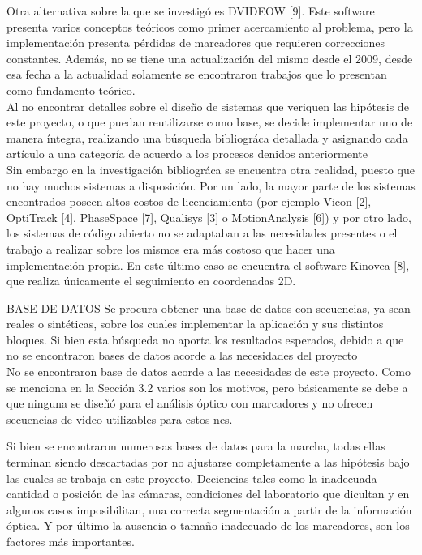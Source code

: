 Otra alternativa sobre la que se investigó es DVIDEOW [9]. Este software presenta
varios conceptos teóricos como primer acercamiento al problema, pero la
implementación presenta pérdidas de marcadores que requieren correcciones constantes.
Además, no se tiene una actualización del mismo desde el 2009, desde esa
fecha a la actualidad solamente se encontraron trabajos que lo presentan como
fundamento teórico.\\

Al no encontrar detalles sobre el diseño de sistemas que veriquen las hipótesis
de este proyecto, o que puedan reutilizarse como base, se decide implementar uno
de manera íntegra, realizando una búsqueda bibliográca detallada y asignando cada
artículo a una categoría de acuerdo a los procesos denidos anteriormente\\

Sin embargo en la investigación bibliográca se encuentra otra realidad, puesto
que no hay muchos sistemas a disposición. Por un lado, la mayor parte de los
sistemas encontrados poseen altos costos de licenciamiento (por ejemplo Vicon [2],
OptiTrack [4], PhaseSpace [7], Qualisys [3] o MotionAnalysis [6]) y por otro lado, los
sistemas de código abierto no se adaptaban a las necesidades presentes o el trabajo
a realizar sobre los mismos era más costoso que hacer una implementación propia.
En este último caso se encuentra el software Kinovea [8], que realiza únicamente el
seguimiento en coordenadas 2D.




BASE DE DATOS
Se procura obtener una base de datos con secuencias, ya sean reales o sintéticas, sobre los cuales implementar la aplicación y sus distintos bloques. Si bien esta búsqueda no aporta los resultados esperados,
 debido a que no se encontraron bases de datos acorde a las necesidades del proyecto\\

No se encontraron base de datos acorde a las necesidades de este proyecto.
Como se menciona en la Sección 3.2 varios son los motivos, pero básicamente se
debe a que ninguna se diseñó para el análisis óptico con marcadores y no ofrecen
secuencias de video utilizables para estos nes.

Si bien se encontraron numerosas bases de datos para la marcha, todas ellas
terminan siendo descartadas por no ajustarse completamente a las hipótesis bajo las
cuales se trabaja en este proyecto. Deciencias tales como la inadecuada cantidad
o posición de las cámaras, condiciones del laboratorio que dicultan y en algunos
casos imposibilitan, una correcta segmentación a partir de la información óptica.
Y por último la ausencia o tamaño inadecuado de los marcadores, son los factores
más importantes.

